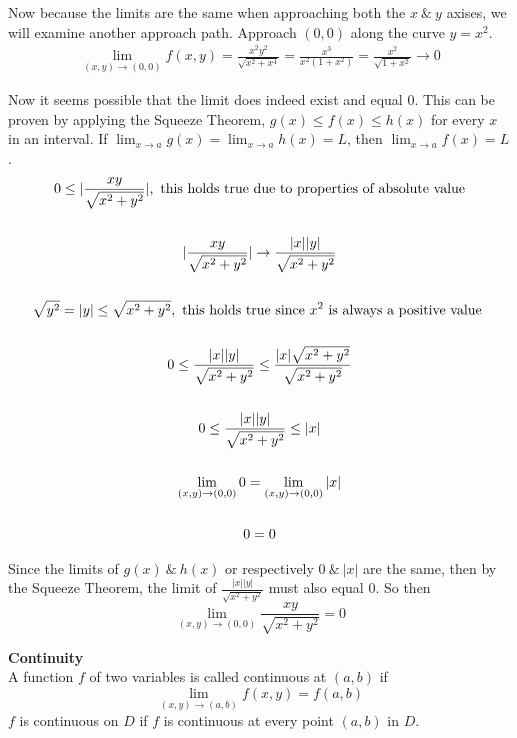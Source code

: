 \documentclass{article}
\begin{document}
 Now because the limits are the same when approaching both the $ x ~\&~ y$ axises, we will examine another approach path. Approach $ (0,0) $ along the curve $ y=x^{2}$.
 \[
   \begin{gathered}
    \lim_{(x,y) \to (0,0)}f(x,y)=\frac{x^{2}y^{2}}{\sqrt{x^{2}+x^{4}}}=\frac{x^{3}}{x^{2}(1+x^{2})}=\frac{x^{2}}{\sqrt{1+x^{2}}}\to0
  \end{gathered}
 \]

 Now it seems possible that the limit does indeed exist and equal $ 0 $. This can be proven by applying the Squeeze Theorem, $ g(x)\le f(x) \le h(x) $ for every $ x $ in an interval. If $ \lim_{x \to a} g(x) = \lim_{x \to a} h(x)=L$, then $ \lim_{x \to a} f(x)=L $.
 \[
   \begin{gathered}
     0 \le | \frac{xy}{\sqrt{x^{2}+y^{2}}} |, \text{ this holds true due to properties of  absolute value}\\
     ~\\
     | \frac{xy}{\sqrt{x^{2}+y^{2}}} |\to \frac{| x || y |}{\sqrt{x^{2}+y^{2}}}\\
     ~\\  
     \sqrt{y^{2}}=| y | \le \sqrt{x^{2}+y^{2} }, \text{ this holds true since $ x^{2}  $ is always a positive value }\\
     ~\\
     0 \le \frac{| x || y |}{\sqrt{x^{2}+y^{2}}} \le \frac{|x|\sqrt{x^{2}+y^{2}}}{\sqrt{x^{2}+y^{2}}}\\
     ~\\
     0 \le \frac{| x || y |}{\sqrt{x^{2} +y^{2} } } \le | x |\\
     ~\\
     \lim_{(x,y) \to (0,0)} 0  = \lim_{(x,y) \to (0,0)} | x |\\
     ~\\
     0 = 0
   \end{gathered}
 \]

 Since the limits of $ g(x) ~\&~ h(x) $ or respectively $ 0 ~\&~ | x | $ are the same, then by the Squeeze Theorem, the limit of $ \frac{| x || y |}{\sqrt{x^{2}+y^{2}  } }  $ must also equal 0. So then
 \[
  \boxed{\lim_{(x,y) \to (0,0)}\frac{xy}{\sqrt{x^{2} +y^{2} } } = 0} 
 \]

 \textbf{Continuity}\\
 A function $ f $ of two variables is called continuous at $ (a,b) $ if
 \[
   \lim_{(x,y) \to (a,b)}f(x,y)=f(a,b) 
 \]
 $ f $ is continuous on $ D $ if $ f $ is continuous at every point $ (a,b) $ in $ D $.
\end{document}
